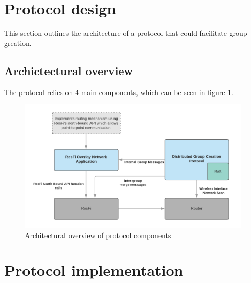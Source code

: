 \section{Protocol design}
This section outlines the architecture of a protocol that could facilitate group greation.  

\subsection{Archictectural overview}
The protocol relies on 4 main components, which can be seen in figure \ref{fig:dgcpoverview}.


\begin{figure}
	\includegraphics[width=\textwidth]{Images/dgcpoverview.png}
		\caption{Architectural overview of protocol components }%
		\label{fig:dgcpoverview}%
\end{figure}




\section{Protocol implementation}
